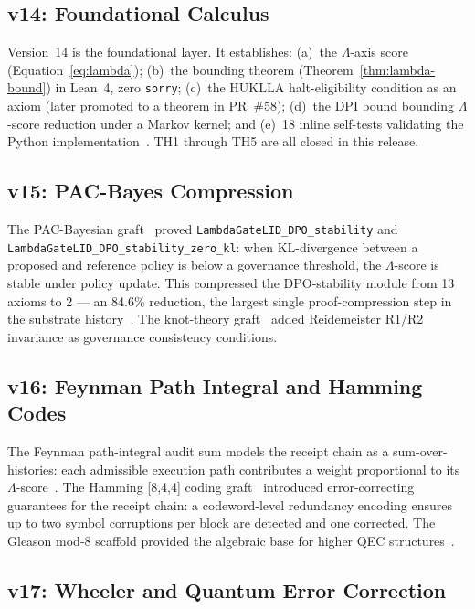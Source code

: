 \subsection{v14: Foundational Calculus}

Version~14 is the foundational layer.
It establishes: (a)~the \(\Lambda\)-axis score (Equation~\ref{eq:lambda});
(b)~the bounding theorem (Theorem~\ref{thm:lambda-bound}) in Lean~4,
zero \texttt{sorry}; (c)~the HUKLLA halt-eligibility condition as an axiom
(later promoted to a theorem in PR~\#58); (d)~the DPI bound bounding
\(\Lambda\)-score reduction under a Markov kernel; and (e)~18 inline
self-tests validating the Python implementation~\cite{lutar2026v14}.
TH1 through TH5 are all closed in this release.

\subsection{v15: PAC-Bayes Compression}

The PAC-Bayesian graft~\cite{catoni2007pac} proved
\texttt{LambdaGateLID\_DPO\_stability} and
\texttt{LambdaGateLID\_DPO\_stability\_zero\_kl}: when KL-divergence between a
proposed and reference policy is below a governance threshold, the
\(\Lambda\)-score is stable under policy update.
This compressed the DPO-stability module from 13 axioms to 2 --- an 84.6\%
reduction, the largest single proof-compression step in the substrate
history~\cite{lutar2026v15}.
The knot-theory graft~\cite{reidemeister1927elementare,witten1989quantum}
added Reidemeister R1/R2 invariance as governance consistency conditions.

\subsection{v16: Feynman Path Integral and Hamming Codes}

The Feynman path-integral audit sum models the receipt chain as a
sum-over-histories: each admissible execution path contributes a weight
proportional to its \(\Lambda\)-score~\cite{witten1989quantum}.
The Hamming [8,4,4] coding graft~\cite{hamming1950error} introduced
error-correcting guarantees for the receipt chain: a codeword-level
redundancy encoding ensures up to two symbol corruptions per block are
detected and one corrected.
The Gleason mod-8 scaffold provided the algebraic base for higher QEC
structures~\cite{lutar2026v16}.

\subsection{v17: Wheeler and Quantum Error Correction}

